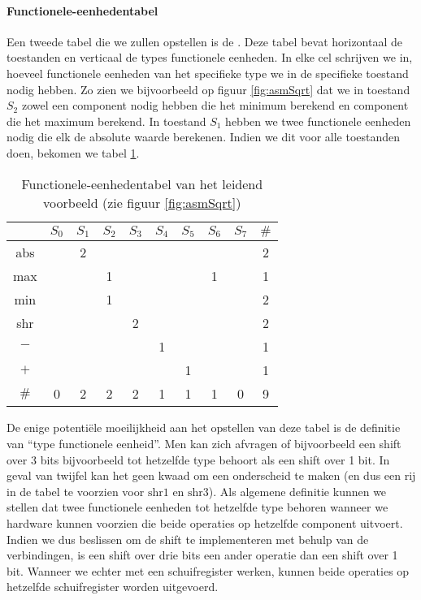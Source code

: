 \paragraph{Functionele-eenhedentabel}
Een tweede tabel die we zullen opstellen is de . Deze tabel bevat horizontaal de toestanden en verticaal de types functionele eenheden. In elke cel schrijven we in, hoeveel functionele eenheden van het specifieke type we in de specifieke toestand nodig hebben. Zo zien we bijvoorbeeld op figuur \ref{fig:asmSqrt} dat we in toestand $S_2$ zowel een component nodig hebben die het minimum berekend en component die het maximum berekend. In toestand $S_1$ hebben we twee functionele eenheden nodig die elk de absolute waarde berekenen. Indien we dit voor alle toestanden doen, bekomen we tabel \ref{tbl:functionalunittableexample}.
\begin{table}[hbt]
\centering
\begin{tabular}{c|cccccccc|c}
	&$S_0$	&$S_1$	&$S_2$	&$S_3$	&$S_4$	&$S_5$	&$S_6$	&$S_7$	&$\#$\\\hline
abs	&	&2	&	&	&	&	&	&	&2\\
max	&	&	&1	&	&	&	&1	&	&1\\
min	&	&	&1	&	&	&	&	&	&2\\
shr	&	&	&	&2	&	&	&	&	&2\\
$-$	&	&	&	&	&1	&	&	&	&1\\
$+$	&	&	&	&	&	&1	&	&	&1\\\hline
$\#$	&0	&2	&2	&2	&1	&1	&1	&0	&9\\
\end{tabular}
\caption{Functionele-eenhedentabel van het leidend voorbeeld (zie figuur \ref{fig:asmSqrt})}
\label{tbl:functionalunittableexample}
\end{table}
De enige potenti\"ele moeilijkheid aan het opstellen van deze tabel is de definitie van ``type functionele eenheid''. Men kan zich afvragen of bijvoorbeeld een shift over 3 bits bijvoorbeeld tot hetzelfde type behoort als een shift over 1 bit. In geval van twijfel kan het geen kwaad om een onderscheid te maken (en dus een rij in de tabel te voorzien voor $\mbox{shr1}$ en $\mbox{shr3}$). Als algemene definitie kunnen we stellen dat twee functionele eenheden tot hetzelfde type behoren wanneer we hardware kunnen voorzien die beide operaties op hetzelfde component uitvoert. Indien we dus beslissen om de shift te implementeren met behulp van de verbindingen, is een shift over drie bits een ander operatie dan een shift over 1 bit. Wanneer we echter met een schuifregister werken, kunnen beide operaties op hetzelfde schuifregister worden uitgevoerd.
